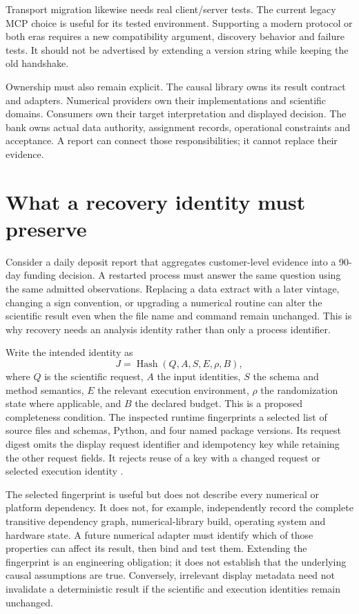 Transport migration likewise needs real client/server tests. The current legacy
MCP choice is useful for its tested environment. Supporting a modern protocol
or both eras requires a new compatibility argument, discovery behavior and
failure tests. It should not be advertised by extending a version string while
keeping the old handshake.

Ownership must also remain explicit. The causal library owns its result
contract and adapters. Numerical providers own their implementations and
scientific domains. Consumers own their target interpretation and displayed
decision. The bank owns actual data authority, assignment records, operational
constraints and acceptance. A report can connect those responsibilities; it
cannot replace their evidence.

\section{What a recovery identity must preserve}

Consider a daily deposit report that aggregates customer-level evidence into
a 90-day funding decision. A restarted process must answer the same question
using the same admitted observations. Replacing a data extract with a later
vintage, changing a sign convention, or upgrading a numerical routine can
alter the scientific result even when the file name and command remain
unchanged. This is why recovery needs an analysis identity rather than only
a process identifier.

Write the intended identity as
\[
 J=\operatorname{Hash}(Q,A,S,E,\rho,B),
\]
where $Q$ is the scientific request, $A$ the input identities, $S$ the schema
and method semantics, $E$ the relevant execution environment, $\rho$ the
randomization state where applicable, and $B$ the declared budget. This is a
proposed completeness condition. The inspected runtime fingerprints a selected
list of source files and schemas, Python, and four named package versions.
Its request digest omits the display request identifier and idempotency key
while retaining the other request fields. It rejects reuse of a key with a
changed request or selected execution identity
\cite{exec13_ops_source}.

The selected fingerprint is useful but does not describe every numerical or
platform dependency. It does not, for example, independently record the
complete transitive dependency graph, numerical-library build, operating
system and hardware state. A future numerical adapter must identify which
of those properties can affect its result, then bind and test them. Extending
the fingerprint is an engineering obligation; it does not establish that the
underlying causal assumptions are true. Conversely, irrelevant display
metadata need not invalidate a deterministic result if the scientific and
execution identities remain unchanged.

